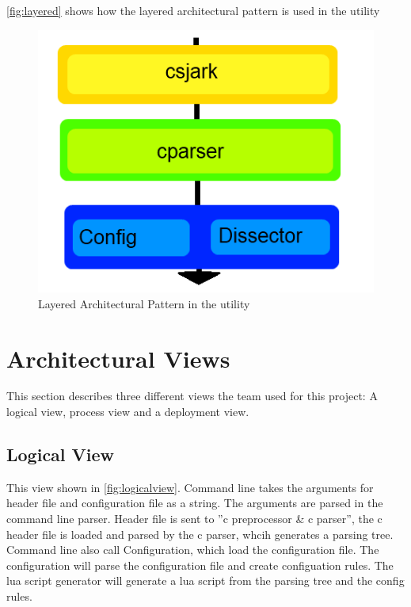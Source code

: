 \autoref{fig:layered} shows how the layered architectural pattern is used in the \gls{utility}

\begin{figure}[htb]
	\includegraphics[width = \textwidth]{./planning/img/layered}
	\caption{Layered Architectural Pattern in the \gls{utility}\label{fig:layered}}
\end{figure}

\section{Architectural Views}
This section describes three different views the team used for this project: A logical view, process view and a deployment view.

\subsection{Logical View}
This view shown in \autoref{fig:logicalview}. Command line takes the arguments for \gls{header} file and configuration file as a string. The arguments are parsed in the command line \gls{parser}. Header file is sent to ''\Gls{c} \gls{preprocessor} \& \Gls{c} \gls{parser}'', the \Gls{c} \gls{header} file is loaded and parsed by the \Gls{c} \gls{parser}, whcih generates a parsing tree. Command line also call Configuration, which load the configuration file. The configuration will parse the configuration file and create configuation rules. The \Gls{lua} \gls{script} generator will generate a \Gls{lua} \gls{script} from the parsing tree and the config rules.

